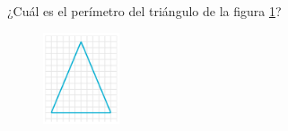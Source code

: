\question[25] ¿Cuál es el perímetro del triángulo de la figura \ref{fig:peri_isos_01}?
\begin{figure}[H]
    \begin{center}
        \includegraphics[width=0.2\textwidth]{../images/peri_isos_01.png}
    \end{center}
    \caption{}
    \label{fig:peri_isos_01}
\end{figure}